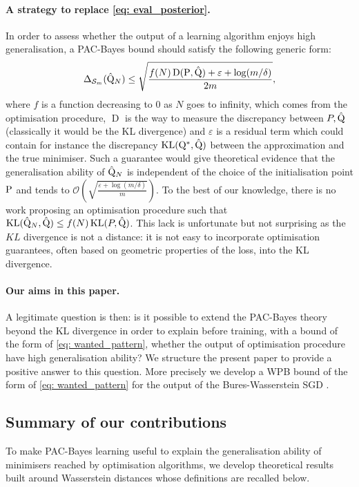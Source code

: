 \paragraph{A strategy to replace \eqref{eq: eval_posterior}.}
In order to assess whether the output of a learning algorithm enjoys high generalisation, a PAC-Bayes bound should satisfy the following generic form:
\begin{align}
\label{eq: wanted_pattern}
\Delta_{\Sm}(\hat{\Q}_N) \leq \sqrt{\frac{f(N)\operatorname{D}(\P,\hat{\Q}) + \varepsilon+ \log(m/\delta)}{2m}},
\end{align}
where $f$ is a function decreasing to $0$ as $N$ goes to infinity, which comes from the optimisation procedure, $\operatorname{D}$ is the way to measure the discrepancy between $P,\hat{\Q}$ (classically it would be the KL divergence) and $\varepsilon$ is a residual term which could contain for instance the discrepancy $\operatorname{KL}(\Q^*,\hat{\Q})$ between the approximation and the true minimiser.
Such a guarantee would give theoretical evidence that the generalisation ability of $\hat{\Q}_N$ is independent of the choice of the initialisation point $\P$ and tends to $\mathcal{O}\left( \sqrt{\frac{\varepsilon + \log(m/\delta)}{m}} \right)$.
To the best of our knowledge, there is no work proposing an optimisation procedure such that $\operatorname{KL}(\hat{\Q}_N,\hat{\Q}) \leq f(N)  \operatorname{KL}(P,\hat{\Q})$.  This lack is unfortunate but not surprising as the $KL$ divergence is not a distance: it is not easy to incorporate optimisation guarantees, often based on geometric properties of the loss, into the KL divergence.

\paragraph{Our aims in this paper.}
A legitimate question is then: is it possible to extend the PAC-Bayes theory beyond the KL divergence in order to explain before training, with a bound of the form of \eqref{eq: wanted_pattern}, whether the output of optimisation procedure have high generalisation ability? We structure the present paper to provide a positive answer to this question. More precisely we develop a WPB bound of the form of \eqref{eq: wanted_pattern} for the output of the Bures-Wasserstein SGD \citep{lambert2022variational}.



\subsection{Summary of our contributions}
\label{sec: intro_contrib}
To make PAC-Bayes learning useful to explain the generalisation ability of minimisers reached by optimisation algorithms, we develop theoretical results built around Wasserstein distances whose definitions are recalled below.

